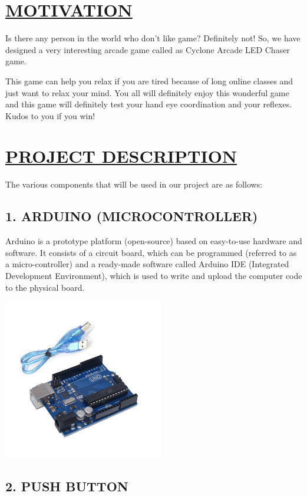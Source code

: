 \documentclass[12pt]{article}
\begin{document}
\section*{\underline{MOTIVATION}}
Is there any person in the world who don’t like game? Definitely not! So, we have designed a very interesting arcade game called as Cyclone Arcade LED Chaser game.

This game can help you relax if you are tired because of long online classes and just want to relax your mind. You all will definitely enjoy this wonderful game and this game will definitely test your hand eye coordination and your reflexes. Kudos to you if you win!

\section*{\underline{PROJECT DESCRIPTION}}
The various components that will be used in our project are as follows:
\subsection*{1. ARDUINO (MICROCONTROLLER)}

\begin{flushleft}
Arduino is a prototype platform (open-source) based on easy-to-use hardware and software. It consists of a circuit board, which can be programmed (referred to as a micro-controller) and a ready-made software called Arduino IDE (Integrated Development Environment), which is used to write and upload the computer code to the physical board.  
\end{flushleft}
\centering
\includegraphics[width=7cm]{arduino.jpg}


\begin{flushleft}
\subsection*{2. PUSH BUTTON}
\end{flushleft}
\end{document}
